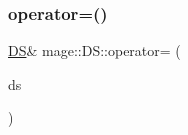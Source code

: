 \hypertarget{structmage_1_1_d_s_ac32f971e1e9c01664bd8d7dfb4404ed4}{}\label{structmage_1_1_d_s_ac32f971e1e9c01664bd8d7dfb4404ed4} 
\subsubsection{\texorpdfstring{operator=()}{operator=()}\hspace{0.1cm}{\footnotesize\ttfamily [2/2]}}
{\footnotesize\ttfamily \hyperlink{structmage_1_1_d_s}{DS}\& mage\+::\+D\+S\+::operator= (\begin{DoxyParamCaption}\item[{\hyperlink{structmage_1_1_d_s}{DS} \&\&}]{ds }\end{DoxyParamCaption})\hspace{0.3cm}{\ttfamily [delete]}}

